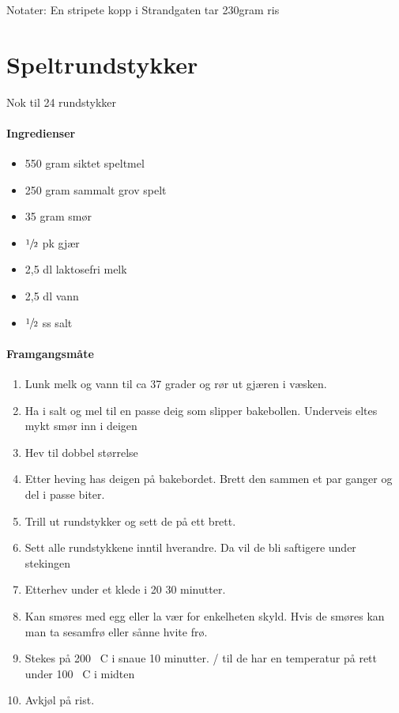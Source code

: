 \documentclass[12pt,a4paper]{book}
\begin{document}
Notater: En stripete kopp i Strandgaten tar 230gram ris
\clearpage{}
\clearpage{}\section{Speltrundstykker}
Nok til 24 rundstykker

\paragraph{Ingredienser}
\begin{itemize}[noitemsep]
	\item 550 gram siktet speltmel
	\item 250 gram sammalt grov spelt
	\item 35 gram smør
	\item  $\sfrac{1}{2}$  pk gjær
	\item 2,5 dl laktosefri melk
	\item 2,5 dl vann
	\item  $\sfrac{1}{2}$  ss salt
\end{itemize}


\paragraph{Framgangsmåte}
\begin{enumerate}[noitemsep]
	\item Lunk melk og vann til ca 37 grader og rør ut gjæren i væsken.
	\item Ha i salt og mel til en passe deig som slipper bakebollen. Underveis eltes mykt smør inn i deigen
	\item Hev til dobbel størrelse
	\item Etter heving has deigen på bakebordet. Brett den sammen et par ganger og del i passe biter.
	\item Trill ut rundstykker og sett de på ett brett.
	\item Sett alle rundstykkene inntil hverandre. Da vil de bli saftigere under stekingen
	\item Etterhev under et klede i 20 30 minutter.
	\item Kan smøres med egg eller la vær for enkelheten skyld. Hvis de smøres kan man ta sesamfrø eller sånne hvite frø.
	\item Stekes på 200 \degree~C i snaue 10 minutter. / til de har en temperatur på rett under 100 \degree~C i midten
	\item Avkjøl på rist.
\end{enumerate}
\end{document}
